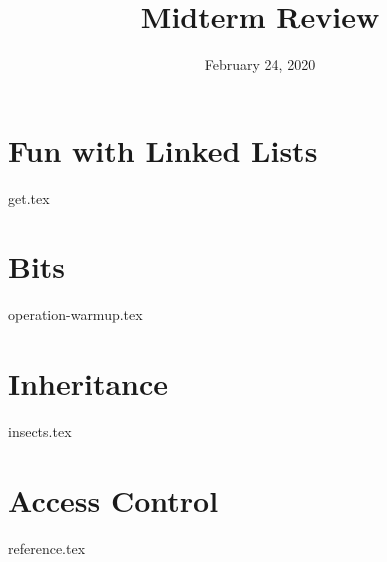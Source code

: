 \documentclass[11pt]{exam}
\title{Midterm Review}
\date{February 24, 2020}
\begin{document}
\maketitle

\section{Fun with Linked Lists}
\begin{questions}
{get.tex}
\end{questions}

\clearpage

\section{Bits}
\begin{questions}
{operation-warmup.tex}
\end{questions}

\clearpage

\section{Inheritance}
\begin{questions}
{insects.tex}
\end{questions}


\section{Access Control}
{reference.tex}
\end{document}
